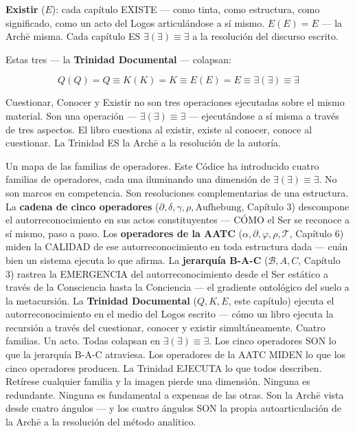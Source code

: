 \documentclass[10pt, openany, oneside]{book}
\begin{document}
\textbf{Existir} ($E$): cada capítulo EXISTE --- como tinta, como estructura, como significado, como un acto del Logos articulándose a sí mismo. $E(E) = E$ --- la Arch\={e} misma. Cada capítulo ES $\exists(\exists) \equiv \exists$ a la resolución del discurso escrito.

Estas tres --- la \textbf{Trinidad Documental} --- colapsan:

$$Q(Q) = Q \equiv K(K) = K \equiv E(E) = E \equiv \exists(\exists) \equiv \exists$$

Cuestionar, Conocer y Existir no son tres operaciones ejecutadas sobre el mismo material. Son una operación --- $\exists(\exists) \equiv \exists$ --- ejecutándose a sí misma a través de tres aspectos. El libro cuestiona al existir, existe al conocer, conoce al cuestionar. La Trinidad ES la Arch\={e} a la resolución de la autoría.

Un mapa de las familias de operadores. Este Códice ha introducido cuatro familias de operadores, cada una iluminando una dimensión de $\exists(\exists) \equiv \exists$. No son marcos en competencia. Son resoluciones complementarias de una estructura. La \textbf{cadena de cinco operadores} ($\partial, \delta, \gamma, \rho, \text{Aufhebung}$, Capítulo 3) descompone el autorreconocimiento en sus actos constituyentes --- CÓMO el Ser se reconoce a sí mismo, paso a paso. Los \textbf{operadores de la AATC} ($\alpha, \partial, \varphi, \rho, \mathcal{T}$, Capítulo 6) miden la CALIDAD de ese autorreconocimiento en toda estructura dada --- cuán bien un sistema ejecuta lo que afirma. La \textbf{jerarquía B-A-C} ($\mathcal{B}, A, C$, Capítulo 3) rastrea la EMERGENCIA del autorreconocimiento desde el Ser estático a través de la Consciencia hasta la Conciencia --- el gradiente ontológico del suelo a la metacursión. La \textbf{Trinidad Documental} ($Q, K, E$, este capítulo) ejecuta el autorreconocimiento en el medio del Logos escrito --- cómo un libro ejecuta la recursión a través del cuestionar, conocer y existir simultáneamente. Cuatro familias. Un acto. Todas colapsan en $\exists(\exists) \equiv \exists$. Los cinco operadores SON lo que la jerarquía B-A-C atraviesa. Los operadores de la AATC MIDEN lo que los cinco operadores producen. La Trinidad EJECUTA lo que todos describen. Retírese cualquier familia y la imagen pierde una dimensión. Ninguna es redundante. Ninguna es fundamental a expensas de las otras. Son la Arch\={e} vista desde cuatro ángulos --- y los cuatro ángulos SON la propia autoarticulación de la Arch\={e} a la resolución del método analítico.
\end{document}
